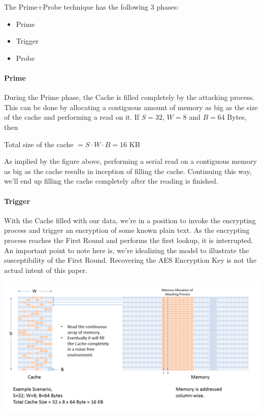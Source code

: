 \documentclass[3p]{elsarticle}
\begin{document}
\begin{flushleft}
The Prime+Probe technique has the following 3 phases:
\end{flushleft}

\begin{itemize}
\item Prime
\item Trigger
\item Probe
\end{itemize}

\paragraph{Prime}
During the Prime phase, the Cache is filled completely by the attacking process. This can be done by allocating a contiguous amount of memory as big as the size of the cache and performing a read on it. If $S=32$, $W=8$ and $B=64$ Bytes, then

\begin{center}
Total size of the cache $=S\cdot W \cdot B=16$ KB
\end{center}

As implied by the figure above, performing a serial read on a contiguous memory as big as the cache results in inception of filling the cache. Continuing this way, we'll end up filling the cache completely after the reading is finished.

\paragraph{Trigger}
With the Cache filled with our data, we're in a position to invoke the encrypting process and trigger an encryption of some known plain text. As the encrypting process reaches the First Round and performs the first lookup, it is interrupted. An important point to note here is, we're idealizing the model to illustrate the susceptibility of the First Round. Recovering the AES Encryption Key is not the actual intent of this paper.

\begin{center}
\includegraphics[scale=0.4,natwidth=1159,natheight=589]{Figures/filling(new).png}
\label{fig: Demonstration of the Cache filling process.}
\end{center}
\end{document}
